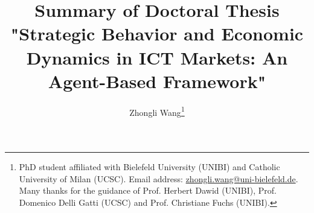 \documentclass[11pt]{article}
\title{Summary of Doctoral Thesis \\ "Strategic Behavior and Economic Dynamics in ICT Markets: An Agent-Based Framework"}
\author{Zhongli Wang\thanks{PhD student affiliated with Bielefeld University (UNIBI) and Catholic University of Milan (UCSC). Email address: \url{zhongli.wang@uni-bielefeld.de}. Many thanks for the guidance of Prof. Herbert Dawid (UNIBI), Prof. Domenico Delli Gatti (UCSC) and Prof. Christiane Fuchs (UNIBI).}}
\begin{document}
% 
\maketitle

\onehalfspacing

\end{document}
